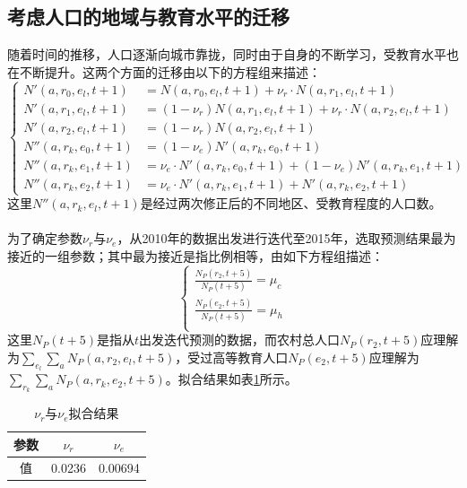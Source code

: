 \documentclass[a4paper]{article}
\begin{document}
\subsection{考虑人口的地域与教育水平的迁移}
随着时间的推移，人口逐渐向城市靠拢，同时由于自身的不断学习，受教育水平也在不断提升。这两个方面的迁移由以下的方程组来描述：
	\begin{equation}
	\left\{	
		\begin{aligned}
			\label{amend_migrate}
			N'(a,r_0,e_l,t+1) &= N(a,r_0,e_l,t+1) + \nu_r \cdot N(a,r_1,e_l,t+1)\\
			N'(a,r_1,e_l,t+1) &= (1 - \nu_r) N(a,r_1,e_l,t+1) + \nu_r \cdot N(a,r_2,e_l,t+1)\\
			N'(a,r_2,e_l,t+1) &= (1 - \nu_r) N(a,r_2,e_l,t+1)\\
			N''(a,r_k,e_0,t+1) &= (1 - \nu_e) N'(a,r_k,e_0,t+1)\\
			N''(a,r_k,e_1,t+1) &= \nu_e \cdot N'(a,r_k,e_0,t+1) + (1 - \nu_e) N'(a,r_k,e_1,t+1)\\
			N''(a,r_k,e_2,t+1) &= \nu_e \cdot N'(a,r_k,e_1,t+1) + N'(a,r_k,e_2,t+1)
		\end{aligned}
	\right.
	\end{equation}
这里$N''(a,r_k,e_l,t+1)$是经过两次修正后的不同地区、受教育程度的人口数。\\\\
\indent
为了确定参数$\nu_r$与$\nu_e$，从2010年的数据出发进行迭代至2015年，选取预测结果最为接近的一组参数；其中最为接近是指比例相等，由如下方程组描述：
	\begin{equation}
	\left\{	
		\begin{aligned}
			\label{amend_migrate_fit}
			\frac{N_P(r_2,t+5)}{N_P(t+5)} = \mu_c \\
			\frac{N_P(e_2,t+5)}{N_P(t+5)} = \mu_h \\
		\end{aligned}
	\right.
	\end{equation}
这里$N_P(t+5)$是指从$t$出发迭代预测的数据，而农村总人口$N_P(r_2,t+5)$应理解为$\sum_{e_l} \sum_a N_P(a,r_2,e_l,t+5)$，受过高等教育人口$N_P(e_2,t+5)$应理解为$\sum_{r_k} \sum_a N_P(a,r_k,e_2,t+5)$。拟合结果如表\ref{amend_migrate_value}所示。
	\begin{table}[H]
		\centering
		\caption{$\nu_r$与$\nu_e$拟合结果}
		\label{amend_migrate_value}
		\begin{tabular}{c|cc}
			参数	&	$\nu_r$	&	$\nu_e$	\\
			\hline
			值		&	 0.0236	&	0.00694	\\
		\end{tabular}
	\end{table}
\end{document}
